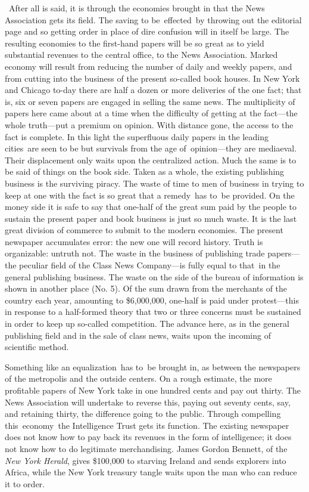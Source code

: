 \documentclass[openany,nobib]{tufte-book}
\begin{document}
~After all is said, it is through the economies brought in that the News
Association gets its field. The saving to be~effected~by throwing out
the editorial page and so getting order in place of dire confusion will
in itself be large. The resulting economies to the first-hand papers
will be so great as to yield substantial revenues to the central office,
to the News Association. Marked economy will result from reducing the
number of daily and weekly papers, and from cutting into the business of
the present so-called book houses. In New York and Chicago to-day there
are half a dozen or more deliveries of the one fact; that is, six or
seven papers are engaged in selling the same news. The multiplicity of
papers here came about at a time when the difficulty of getting at the
fact---the whole truth---put a premium on opinion. With distance gone,
the access to the fact is complete. In this light the superfluous daily
papers in the leading cities~are seen to be but survivals from the age
of~opinion---they are mediaeval. Their displacement only waits upon the
centralized action. Much the same is to be said of things on the book
side. Taken as a whole, the existing publishing business is the
surviving piracy. The waste of time to men of business in trying to keep
at one with the fact is so great that a remedy~has to~be provided. On
the money side it is safe to say that one-half of the great sum paid by
the people to sustain the present paper and book business is just so
much waste. It is the last great division of commerce to submit to the
modern economies. The present newspaper accumulates error: the new one
will record history. Truth is organizable: untruth not. The waste in the
business of publishing trade papers---the peculiar field of the Class
News Company---is fully equal to that~in the general publishing
business. The waste on the side of the bureau of information is shown in
another place (No. 5). Of the sum drawn from the merchants of the
country each year, amounting to \$6,000,000, one-half is paid under
protest---this in response to a half-formed theory that two or three
concerns must be sustained in order to keep up so-called competition.
The advance here, as in the general publishing field and in the sale of
class news, waits upon the incoming of scientific method.~

Something like an equalization~has to~be brought in, as between the
newspapers of the metropolis and the outside centers. On a rough
estimate, the more profitable papers of New York take in one hundred
cents and pay out thirty. The News Association will undertake to reverse
this, paying out seventy cents, say, and retaining thirty, the
difference going to the public. Through compelling this~economy~the
Intelligence Trust gets its function. The existing newspaper does not
know how to pay back its revenues in the form of intelligence; it does
not know how to do legitimate merchandising. James Gordon Bennett, of
the \emph{New York Herald}, gives \$100,000 to starving Ireland and
sends explorers into Africa, while the New York treasury tangle waits
upon the man who can reduce it to order.~
\end{document}
